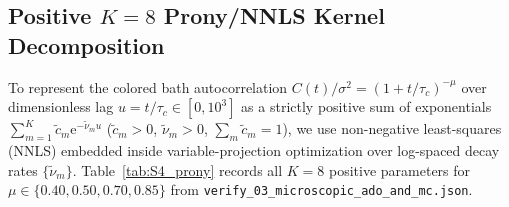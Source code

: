 \documentclass[onecolumn,10pt,notitlepage,amsmath,amssymb,floatfix]{revtex4-2}
\theoremstyle{plain}
\theoremstyle{definition}
\newcommand{\ee}{\mathrm{e}}
\begin{document}
\subsection{Positive \texorpdfstring{$K=8$}{K=8} Prony/NNLS Kernel Decomposition}

To represent the colored bath autocorrelation $C(t)/\sigma^2 = (1 + t/\tau_c)^{-\mu}$ over dimensionless lag $u = t/\tau_c \in [0, 10^3]$ as a strictly positive sum of exponentials $\sum_{m=1}^K \tilde{c}_m \ee^{-\tilde{\nu}_m u}$ ($\tilde{c}_m > 0$, $\tilde{\nu}_m > 0$, $\sum_m \tilde{c}_m = 1$), we use non-negative least-squares (NNLS) embedded inside variable-projection optimization over log-spaced decay rates $\{\tilde{\nu}_m\}$. Table~\ref{tab:S4_prony} records all $K=8$ positive parameters for $\mu \in \{0.40, 0.50, 0.70, 0.85\}$ from \texttt{verify\_03\_microscopic\_ado\_and\_mc.json}.
\end{document}

